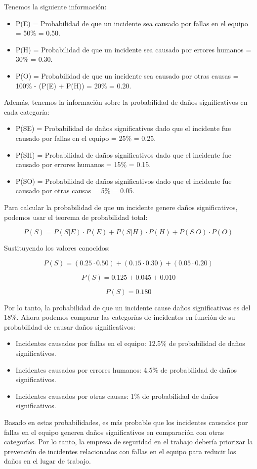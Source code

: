 \documentclass[
]{article}
\providecommand{\tightlist}{%
  \setlength{\itemsep}{0pt}\setlength{\parskip}{0pt}}
\begin{document}
Tenemos la siguiente información:

\begin{itemize}
\tightlist
\item
  P(E) = Probabilidad de que un incidente sea causado por fallas en el
  equipo = 50\% = 0.50.
\item
  P(H) = Probabilidad de que un incidente sea causado por errores
  humanos = 30\% = 0.30.
\item
  P(O) = Probabilidad de que un incidente sea causado por otras causas =
  100\% - (P(E) + P(H)) = 20\% = 0.20.
\end{itemize}

Además, tenemos la información sobre la probabilidad de daños
significativos en cada categoría:

\begin{itemize}
\tightlist
\item
  P(S\textbar E) = Probabilidad de daños significativos dado que el
  incidente fue causado por fallas en el equipo = 25\% = 0.25.
\item
  P(S\textbar H) = Probabilidad de daños significativos dado que el
  incidente fue causado por errores humanos = 15\% = 0.15.
\item
  P(S\textbar O) = Probabilidad de daños significativos dado que el
  incidente fue causado por otras causas = 5\% = 0.05.
\end{itemize}

Para calcular la probabilidad de que un incidente genere daños
significativos, podemos usar el teorema de probabilidad total:

\[P(S) = P(S|E) \cdot P(E) + P(S|H) \cdot P(H) + P(S|O) \cdot P(O)\]

Sustituyendo los valores conocidos:

\[P(S) = (0.25 \cdot 0.50) + (0.15 \cdot 0.30) + (0.05 \cdot 0.20)\]

\[P(S) = 0.125 + 0.045 + 0.010\]

\[P(S) = 0.180\]

Por lo tanto, la probabilidad de que un incidente cause daños
significativos es del 18\%. Ahora podemos comparar las categorías de
incidentes en función de su probabilidad de causar daños significativos:

\begin{itemize}
\tightlist
\item
  Incidentes causados por fallas en el equipo: 12.5\% de probabilidad de
  daños significativos.
\item
  Incidentes causados por errores humanos: 4.5\% de probabilidad de
  daños significativos.
\item
  Incidentes causados por otras causas: 1\% de probabilidad de daños
  significativos.
\end{itemize}

Basado en estas probabilidades, es más probable que los incidentes
causados por fallas en el equipo generen daños significativos en
comparación con otras categorías. Por lo tanto, la empresa de seguridad
en el trabajo debería priorizar la prevención de incidentes relacionados
con fallas en el equipo para reducir los daños en el lugar de trabajo.
\end{document}
